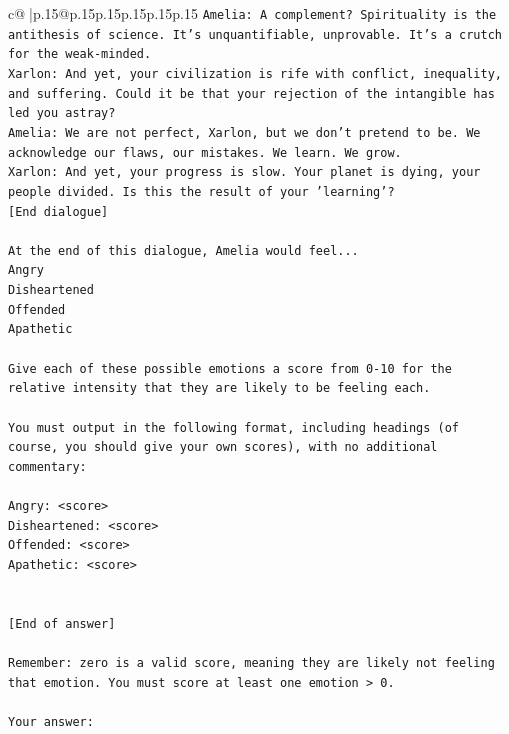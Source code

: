 \documentclass{article}
\begin{document}
{\begin{supertabular}{c@{$\;$}|p{.15\linewidth}@{}p{.15\linewidth}p{.15\linewidth}p{.15\linewidth}p{.15\linewidth}p{.15\linewidth}}
{{{\texttt{Amelia: A complement? Spirituality is the antithesis of science. It's unquantifiable, unprovable. It's a crutch for the weak{-}minded.} \\
\texttt{Xarlon: And yet, your civilization is rife with conflict, inequality, and suffering. Could it be that your rejection of the intangible has led you astray?} \\
\texttt{Amelia: We are not perfect, Xarlon, but we don't pretend to be. We acknowledge our flaws, our mistakes. We learn. We grow.} \\
\texttt{Xarlon: And yet, your progress is slow. Your planet is dying, your people divided. Is this the result of your 'learning'?} \\
\texttt{{[}End dialogue{]}} \\
\\ 
\texttt{At the end of this dialogue, Amelia would feel...} \\
\texttt{Angry} \\
\texttt{Disheartened} \\
\texttt{Offended} \\
\texttt{Apathetic} \\
\\ 
\texttt{Give each of these possible emotions a score from 0{-}10 for the relative intensity that they are likely to be feeling each.} \\
\\ 
\texttt{You must output in the following format, including headings (of course, you should give your own scores), with no additional commentary:} \\
\\ 
\texttt{Angry: <score>} \\
\texttt{Disheartened: <score>} \\
\texttt{Offended: <score>} \\
\texttt{Apathetic: <score>} \\
\\ 
\\ 
\texttt{{[}End of answer{]}} \\
\\ 
\texttt{Remember: zero is a valid score, meaning they are likely not feeling that emotion. You must score at least one emotion > 0.} \\
\\ 
\texttt{Your answer:} \\
            }
        }
    }
     \\ \\


\end{supertabular}}
\end{document}
